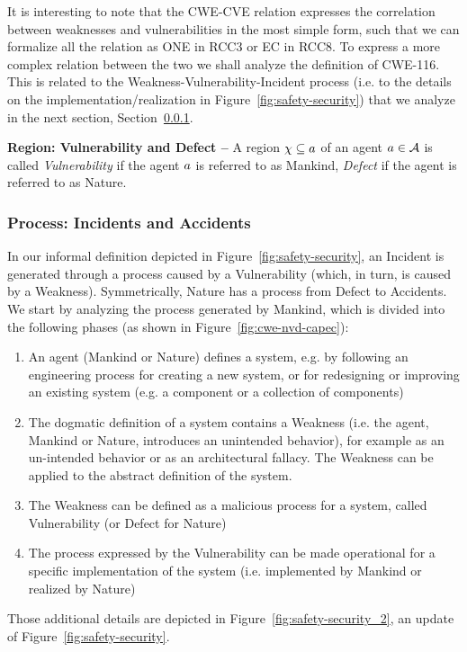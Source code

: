 It is interesting to note that the CWE-CVE relation expresses the correlation
between weaknesses and vulnerabilities in the most simple form, such that we
can formalize all the relation as ONE in RCC3 or EC in RCC8.  To express a more
complex relation between the two we shall analyze the definition of CWE-116.
This is related to the Weakness-Vulnerability-Incident process (i.e. to the
details on the implementation/realization in Figure~\ref{fig:safety-security})
that we analyze in the next section, Section~\ref{sec:incidentaccident}.

\begin{definition}{\bf Region: Vulnerability and Defect --}\label{def:vulnerability-defect}
A region $\chi\subseteq a$ of an agent $a\in\mathcal{A}$ is
	called \emph{Vulnerability} if the agent $a$ is referred to as Mankind, 
	\emph{Defect} if the agent is referred to as Nature.
\end{definition}

\subsubsection{Process: Incidents and Accidents}\label{sec:incidentaccident}
In our informal definition depicted in Figure~\ref{fig:safety-security}, an
Incident is generated through a process caused by a Vulnerability (which,
in turn, is caused by a Weakness). Symmetrically, Nature has a process from Defect
to Accidents. We start by analyzing the process generated by Mankind, which is
divided into the following phases (as shown in Figure~\ref{fig:cwe-nvd-capec}):
\begin{enumerate}
	\item An agent (Mankind or Nature) defines a system, e.g. by following an engineering process for creating a new system, or for redesigning or improving an existing system (e.g. a component or a collection of components) 
	\item The dogmatic definition of a system contains a Weakness (i.e. the agent, Mankind or Nature, introduces an unintended behavior), for example as an un-intended behavior or as an architectural fallacy. The Weakness can be applied to the abstract definition of the system.
	\item The Weakness can be defined as a malicious process for a system, called Vulnerability (or Defect for Nature)
	\item The process expressed by the Vulnerability can be made operational for a specific implementation of the system (i.e. implemented by Mankind or realized by Nature) 
\end{enumerate}
Those additional details are depicted in Figure~\ref{fig:safety-security_2}, an update
of Figure~\ref{fig:safety-security}.

